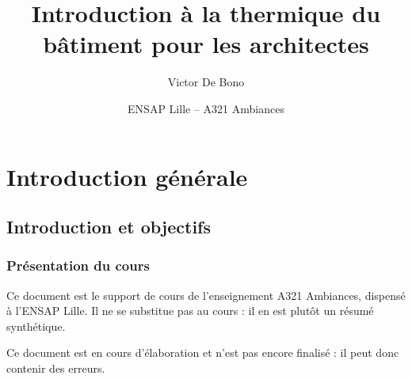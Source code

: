 \documentclass[11pt,a4paper]{book}
\title{Introduction à la thermique du bâtiment pour les architectes}
\author{Victor De Bono}
\date{ENSAP Lille -- A321 Ambiances}
\begin{document}
\frontmatter
\maketitle

\mainmatter
\part{Introduction générale}
\chapter{Introduction et objectifs}
\label{chap:introduction}

\section{Présentation du cours}
Ce document est le support de cours de l'enseignement A321 Ambiances, dispensé à l'ENSAP Lille. Il ne se substitue pas au cours : il en est plutôt un résumé synthétique.

Ce document est en cours d'élaboration et n'est pas encore finalisé : il peut donc contenir des erreurs.\\
\end{document}
